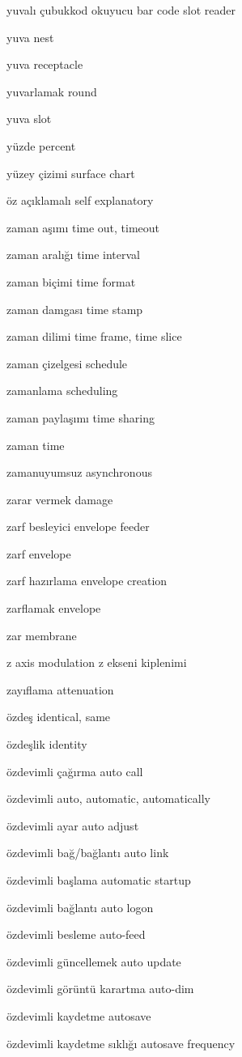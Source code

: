 \documentclass[12pt,fleqn]{article}\usepackage{../../common}
\begin{document}
yuvalı çubukkod okuyucu bar code slot reader

yuva nest

yuva receptacle

yuvarlamak round

yuva slot

yüzde percent

yüzey çizimi surface chart

öz açıklamalı self explanatory

zaman aşımı time out, timeout

zaman aralığı time interval

zaman biçimi time format

zaman damgası time stamp

zaman dilimi time frame, time slice

zaman çizelgesi schedule

zamanlama scheduling

zaman paylaşımı time sharing

zaman time

zamanuyumsuz asynchronous

zarar vermek damage

zarf besleyici envelope feeder

zarf envelope

zarf hazırlama envelope creation

zarflamak envelope

zar membrane

z axis modulation z ekseni kiplenimi

zayıflama attenuation

özdeş identical, same

özdeşlik identity

özdevimli çağırma auto call

özdevimli auto, automatic, automatically

özdevimli ayar auto adjust

özdevimli bağ/bağlantı auto link

özdevimli başlama automatic startup

özdevimli bağlantı auto logon

özdevimli besleme auto-feed

özdevimli güncellemek auto update

özdevimli görüntü karartma auto-dim

özdevimli kaydetme autosave

özdevimli kaydetme sıklığı autosave frequency
\end{document}
